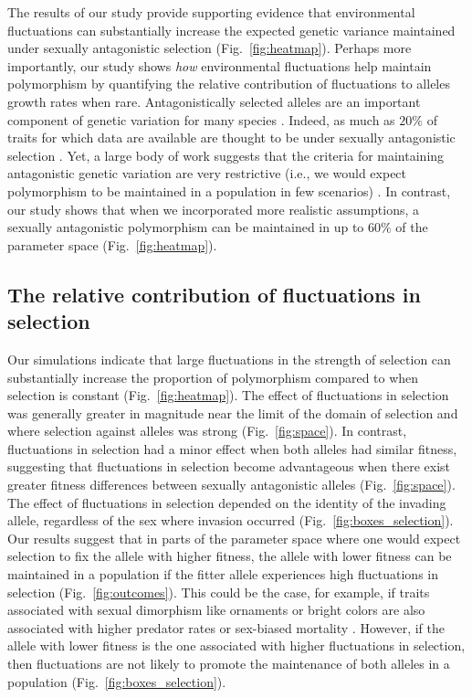 \begin{refsection}
The results of our study provide supporting evidence that environmental fluctuations can substantially increase the expected genetic variance maintained under sexually antagonistic selection (Fig.~\ref{fig:heatmap}). Perhaps more importantly, our study shows \textit{how} environmental fluctuations help maintain polymorphism by quantifying the relative contribution of fluctuations to alleles growth rates when rare. Antagonistically selected alleles are an important component of genetic variation for many species \citep{foerster2007sexually,van2009intralocus,bonduriansky2009intralocus,innocenti2010sexually}. Indeed, as much as $20\%$ of traits for which data are available are thought to be under sexually antagonistic selection \citep{morrissey2016meta}. Yet, a large body of work suggests that the criteria for maintaining antagonistic genetic variation are very restrictive (i.e., we would expect polymorphism to be maintained in a population in few scenarios) \citep{kidwell1977regions,pamilo1979genic,hedrick1999antagonistic,curtsinger1994antagonistic,patten2010fitness}. In contrast, our study shows that when we incorporated more realistic assumptions, a sexually antagonistic polymorphism can be maintained in up to $60\%$ of the parameter space (Fig.~\ref{fig:heatmap}).


\subsection*{The relative contribution of fluctuations in selection}


Our simulations indicate that large fluctuations in the strength of selection can substantially increase the proportion of polymorphism compared to when selection is constant (Fig.~\ref{fig:heatmap}). The effect of fluctuations in selection was generally greater in magnitude near the limit of the domain of selection and where selection against alleles was strong (Fig.~\ref{fig:space}). In contrast, fluctuations in selection had a minor effect when both alleles had similar fitness, suggesting that fluctuations in selection become advantageous when there exist greater fitness differences between sexually antagonistic alleles (Fig.~\ref{fig:space}). The effect of fluctuations in selection depended on the identity of the invading allele, regardless of the sex where invasion occurred (Fig.~\ref{fig:boxes_selection}). Our results suggest that in parts of the parameter space where one would expect selection to fix the allele with higher fitness, the allele with lower fitness can be maintained in a population if the fitter allele experiences high fluctuations in selection (Fig.~\ref{fig:outcomes}). This could be the case, for example, if traits associated with sexual dimorphism like ornaments or bright colors are also associated with higher predator rates \citep{bildstein1989consequences,gotmark1997natural} or sex-biased mortality \citep{promislow1992mortality}. However, if the allele with lower fitness is the one associated with higher fluctuations in selection, then fluctuations are not likely to promote the maintenance of both alleles in a population (Fig.~\ref{fig:boxes_selection}).



\end{refsection}
